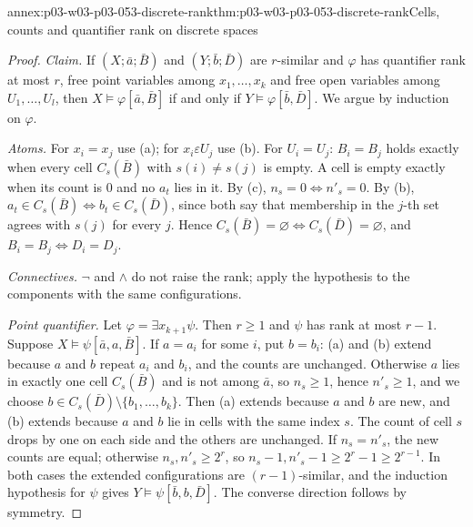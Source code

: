 \begin{annexitem}{annex:p03-w03-p03-053-discrete-rank}{thm:p03-w03-p03-053-discrete-rank}{Cells, counts and quantifier rank on discrete spaces}
\begin{proof}
\emph{Claim.} If \((X;\bar a;\bar B)\) and \((Y;\bar b;\bar D)\) are
\(r\)-similar and \(\varphi\) has quantifier rank at most \(r\), free point
variables among \(x_1,\ldots,x_k\) and free open variables among
\(U_1,\ldots,U_l\), then \(X\models\varphi[\bar a,\bar B]\) if and only if
\(Y\models\varphi[\bar b,\bar D]\). We argue by induction on \(\varphi\).

\emph{Atoms.} For \(x_i=x_j\) use (a); for \(x_i\varepsilon U_j\) use (b).
For \(U_i=U_j\): \(B_i=B_j\) holds exactly when every cell \(C_s(\bar B)\)
with \(s(i)\ne s(j)\) is empty. A cell is empty exactly when its count is
\(0\) and no \(a_t\) lies in it. By (c), \(n_s=0\iff n'_s=0\). By (b),
\(a_t\in C_s(\bar B)\iff b_t\in C_s(\bar D)\), since both say that
membership in the \(j\)-th set agrees with \(s(j)\) for every \(j\). Hence
\(C_s(\bar B)=\varnothing\iff C_s(\bar D)=\varnothing\), and
\(B_i=B_j\iff D_i=D_j\).

\emph{Connectives.} \(\neg\) and \(\land\) do not raise the rank; apply the
hypothesis to the components with the same configurations.

\emph{Point quantifier.} Let \(\varphi=\exists x_{k+1}\psi\). Then
\(r\ge1\) and \(\psi\) has rank at most \(r-1\). Suppose
\(X\models\psi[\bar a,a,\bar B]\). If \(a=a_i\) for some \(i\), put
\(b=b_i\): (a) and (b) extend because \(a\) and \(b\) repeat \(a_i\) and
\(b_i\), and the counts are unchanged. Otherwise \(a\) lies in exactly one
cell \(C_s(\bar B)\) and is not among \(\bar a\), so \(n_s\ge1\), hence
\(n'_s\ge1\), and we choose \(b\in C_s(\bar D)\setminus\{b_1,\ldots,b_k\}\).
Then (a) extends because \(a\) and \(b\) are new, and (b) extends because
\(a\) and \(b\) lie in cells with the same index \(s\). The count of cell
\(s\) drops by one on each side and the others are unchanged. If
\(n_s=n'_s\), the new counts are equal; otherwise
\(n_s,n'_s\ge2^r\), so \(n_s-1,n'_s-1\ge2^r-1\ge2^{r-1}\). In both cases
the extended configurations are \((r-1)\)-similar, and the induction
hypothesis for \(\psi\) gives \(Y\models\psi[\bar b,b,\bar D]\). The
converse direction follows by symmetry.


\end{proof}
\end{annexitem}
